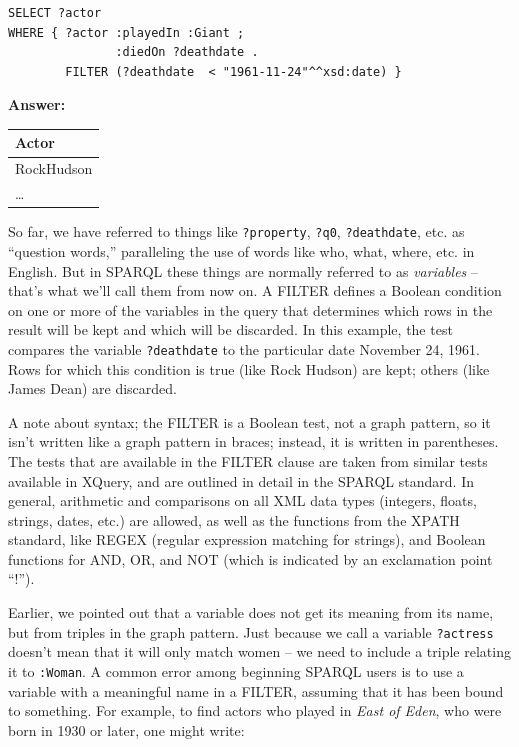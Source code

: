 
\begin{lstlisting}
SELECT ?actor
WHERE { ?actor :playedIn :Giant ;
               :diedOn ?deathdate . 
        FILTER (?deathdate  < "1961-11-24"^^xsd:date) }
\end{lstlisting}

\textbf{\textbf{Answer:}}

\begin{tabular}{|l|}
\hline
Actor\\
\hline
RockHudson\\
\ldots\\
\hline
\end{tabular}


So far, we have referred to things like \texttt{?property}, \texttt{?q0}, \texttt{?deathdate}, etc.
as ``question words,'' paralleling the use of words like who, what,
where, etc. in English. But in SPARQL these things are normally referred
to as \emph{variables} -- that's what we'll call them from now on. A
FILTER defines a Boolean condition on one or more of the variables in
the query that determines which rows in the result will be kept and
which will be discarded. In this example, the test compares the variable
\texttt{?deathdate} to the particular date November 24, 1961. Rows for which this
condition is true (like Rock Hudson) are kept; others (like James Dean)
are discarded.

A note about syntax; the FILTER is a Boolean test, not a graph pattern,
so it isn't written like a graph pattern in braces; instead, it is
written in parentheses. The tests that are available in the FILTER
clause are taken from similar tests available in XQuery, and are
outlined in detail in the SPARQL standard. \cite{Harris:13:SQL} In general, arithmetic and
comparisons on all XML data types (integers, floats, strings, dates,
etc.) are allowed, as well as the functions from the XPATH standard,  like REGEX (regular
expression matching for strings), and Boolean functions for AND, OR, and
NOT (which is indicated by an exclamation point ``!'').

Earlier, we pointed out that a variable does not get its meaning from
its name, but from triples in the graph pattern. Just because we call a
variable \texttt{?actress} doesn't mean that it will only match women -- we need
to include a triple relating it to \texttt{:Woman}. A common error among
beginning SPARQL users is to use a variable with a meaningful name in a
FILTER, assuming that it has been bound to something. For example, to
find actors who played in \emph{East of Eden}, who were born in 1930 or
later, one might write:



